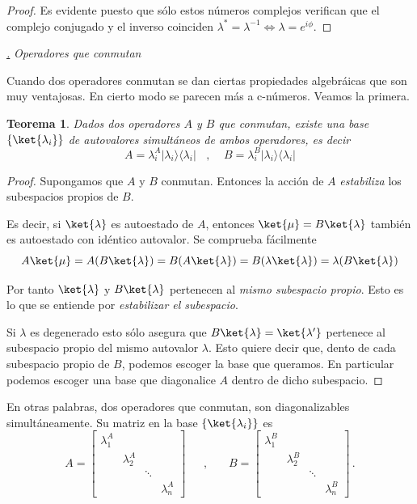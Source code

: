 \documentclass[a4paper,11pt]{book} %
\newtheorem{teorema_contador}{Teorema}
\newcommand{\Teorema}[1]{
		\begin{mybox_gray2}{}
			\begin{teorema_contador}
				 #1 
			\end{teorema_contador} 
		\end{mybox_gray2}
	}
\numberwithin{equation}{chapter}
\newcommand{\ketbra}[2]{| #1\rangle \! \langle #2|}
\def\subsubiContadorIt{\par\addtocounter{subsubsection}{1}\underline{\it\thesubsubsection.}\hskip0.5cm \setcounter{subsubsubsectionIt}{0}}
\newcommand{\SubsubiIt}[1]{
		\subsubiContadorIt \textit{#1}
	}
\newcounter{subsubsubsectionIt}[subsubsection]
\begin{document}
\begin{proof}
Es evidente puesto que sólo estos números complejos verifican que el complejo conjugado y el inverso coinciden $\lambda^* = \lambda^{-1} \Leftrightarrow \lambda = e^{i\phi}$. 
\end{proof}



			\SubsubiIt{Operadores que conmutan}

Cuando dos operadores conmutan se dan ciertas propiedades algebráicas que son muy ventajosas. En cierto modo se parecen más a c-números. Veamos la primera.

	\Teorema{
	Dados dos operadores $A$ y $B$ que conmutan, existe una base $\{\ket{\lambda_i}\}$ de autovalores simultáneos de ambos operadores, es decir 
	\begin{equation}
	A = \lambda_i^A\ketbra{\lambda_i}{\lambda_i} ~~~~,~~~~~ B= \lambda_i^B\ketbra{\lambda_i}{\lambda_i} 
	\end{equation}
	}

	\begin{proof}
	Supongamos que $A$ y $B$ conmutan. Entonces la acción de $A$ \textit{estabiliza} los subespacios propios de $B$. 
\vspace{0.3cm}

Es decir, si $\ket{\lambda}$ es autoestado de $A$, entonces $\ket{\mu} = B\ket{\lambda}  $ también es autoestado con idéntico autovalor. Se comprueba fácilmente
\begin{equation}
A \ket{\mu} = A(B\ket{\lambda} ) = B(A\ket{\lambda}) = B(\lambda\ket{\lambda}) = \lambda (B\ket{\lambda})
\end{equation}

Por tanto $\ket{\lambda}$ y $B\ket{\lambda}$ pertenecen al \textit{mismo subespacio propio}. Esto es lo que se entiende por \textit{estabilizar el subespacio}. 
\vspace{0.3cm}

Si $\lambda$ es degenerado esto sólo asegura que $B\ket{\lambda} = \ket{\lambda'}$ pertenece al subespacio propio del mismo autovalor $\lambda$. Esto quiere decir que, dento de cada subespacio propio de $B$, podemos escoger la base que queramos. En particular podemos escoger una base que diagonalice $A$ dentro de dicho subespacio.  
	\end{proof}

En otras palabras, dos operadores que conmutan, son diagonalizables simultáneamente. Su matriz en la base $\{\ket{\lambda_i}\}$ es
\begin{equation}
A = \begin{bmatrix} \lambda^A_1 & & &  \\ & \lambda^A_2 & &   \\ & & \ddots &  \\ & & & \lambda^A_n 
\end{bmatrix}~~~~~~~,~~~~~~~~
B = \begin{bmatrix} \lambda^B_1 & & &  \\ & \lambda^B_2 & &   \\ & & \ddots &  \\ & & & \lambda^B_n 
\end{bmatrix}\, .
\end{equation}
\end{document}

